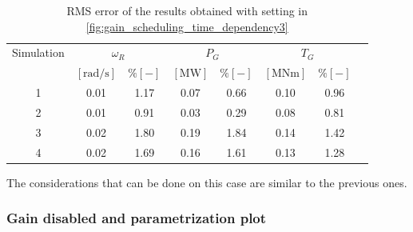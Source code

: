 \begin{table}[htb]
  \caption{RMS error of the results obtained with setting in \autoref{fig:gain_scheduling_time_dependency3}}
  \centering
  \begin{tabular}{cccccccc}
    \toprule
      Simulation & \multicolumn{2}{c}{$\omega_R$} & \multicolumn{2}{c}{$P_G$} & \multicolumn{2}{c}{$T_G$} \\ 
       & $\left[\si{\radian\per\second}\right]$ & $ \% \left[-\right]$ & $\left[\si{\mega\watt}\right]$ & $ \% \left[-\right]$ & $\left[\si{\mega\newton\meter} \right]$ & $ \% \left[-\right]$ \\ \midrule        
     1 & 0.01 &  1.17 &  0.07  &  0.66  &  0.10  &  0.96  \\
     2 & 0.01 &  0.91 &  0.03  &  0.29  &  0.08  &  0.81  \\
     3 & 0.02 &  1.80 &  0.19  &  1.84  &  0.14  &  1.42  \\
     4 & 0.02 &  1.69 &  0.16  &  1.61  &  0.13  &  1.28 \\ 
    
     \bottomrule
  \end{tabular}
  \label{tab:res_variable_gains3}
\end{table}

The considerations that can be done on this case are similar to the previous ones. 

\subsubsection{Gain disabled and parametrization plot}\label{subsec:gain_disabled}

